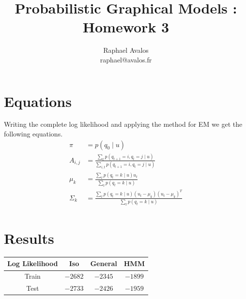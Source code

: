 \documentclass[a4paper]{article}
\title{Probabilistic Graphical Models : Homework 3}
\author{Raphael Avalos\\raphael@avalos.fr}
\begin{document}
\maketitle
\section*{Equations}
Writing the complete log likelihood and applying the method for EM we get the following equations.
\begin{align*}
\pi &= p(q_0 \mid u)\\
A_{i,j} &= \frac{\sum_t p(q_{t+1} = i, q_t=j \mid u)}{\sum_{i,t} p(q_{t+1} = i, q_t=j \mid u)} \\
\mu_k &= \frac{\sum_t p(q_t = k \mid u) u_t}{\sum_t p(q_t = k \mid u)}\\
\Sigma_k &= \frac{\sum_t p(q_t = k \mid u) (u_t - \mu_k)(u_t - \mu_k)^T}{\sum_t p(q_t = k \mid u)}\\
\end{align*} 



\section*{Results}
\begin{tabular}{|c|c|c|c|}
\hline 
Log Likelihood & Iso & General & HMM\\ 
\hline 
Train & $-2682$ & $-2345$ & $-1899$\\ 
\hline 
Test  & $-2733$ & $-2426$ & $-1959$\\
\hline
\end{tabular}
\\\\
\end{document}
